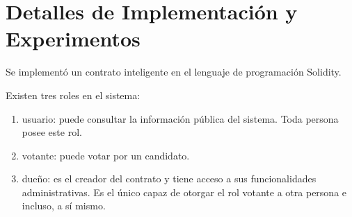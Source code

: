\chapter{Detalles de Implementación y Experimentos}\label{chapter:implementation}


Se implement\'o un contrato inteligente en el lenguaje de programaci\'on Solidity. 

Existen tres roles en el sistema: 
\begin{enumerate}
    \item usuario: puede consultar la informaci\'on p\'ublica del sistema. Toda persona posee este rol.
    \item votante: puede votar por un candidato. 
    \item due\~no: es el creador del contrato y tiene acceso a sus funcionalidades administrativas. Es el \'unico capaz de otorgar el rol votante a otra persona e incluso, a s\'i mismo. 
\end{enumerate}

